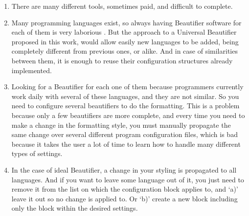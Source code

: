    \begin{enumerate}[leftmargin=*]
        \item There are many different tools, sometimes paid, and difficult to
              complete. \cite{universalCodeFormatter}

        \item Many programming languages exist, so always having Beautifier
              software for each of them is very laborious
              \cite{universalCodeFormatter}. But the approach to a Universal
              Beautifier proposed in this work, would allow easily new languages to be
              added, being completely different from previous ones, or alike. And in
              case of similarities between them, it is enough to reuse their
              configuration structures already implemented.

        \item Looking for a Beautifier for each one of them because programmers
              currently work daily with several of these languages, and they are not
              similar. So you need to configure several beautifiers to do the
              formatting. This is a problem because only a few beautifiers are more
              complete, and every time you need to make a change in the formatting
              style, you must manually propagate the same change over several
              different program configuration files, which is bad because it takes the
              user a lot of time to learn how to handle many different types of
              settings. \cite{Schweitzer}

        \item In the case of ideal Beautifier, a change in your styling is
              propagated to all languages. And if you want to leave some language out
              of it, you just need to remove it from the list on which the
              configuration block applies to, and `a)' leave it out so no change is
              applied to. Or `b)' create a new block including only the block within
              the desired settings.

    \end{enumerate}






